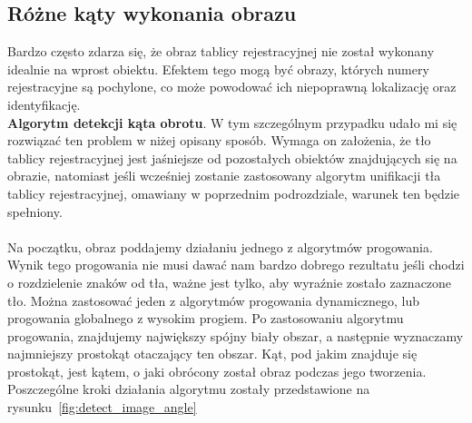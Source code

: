 \subsection{Różne kąty wykonania obrazu}
Bardzo często zdarza się, że obraz tablicy rejestracyjnej nie został wykonany idealnie na wprost obiektu. Efektem tego mogą być obrazy, których numery rejestracyjne są pochylone, co może powodować ich niepoprawną lokalizację oraz identyfikację. \\
\textbf{Algorytm detekcji kąta obrotu}. W tym szczególnym przypadku udało mi się rozwiązać ten problem w niżej opisany sposób. Wymaga on założenia, że tło tablicy rejestracyjnej jest jaśniejsze od pozostałych obiektów znajdujących się na obrazie, natomiast jeśli wcześniej zostanie zastosowany algorytm unifikacji tła tablicy rejestracyjnej, omawiany w poprzednim podrozdziale, warunek ten będzie spełniony.
\paragraph{}
Na początku, obraz poddajemy działaniu jednego z algorytmów progowania. Wynik tego progowania nie musi dawać nam bardzo dobrego rezultatu jeśli chodzi o rozdzielenie znaków od tła, ważne jest tylko, aby wyraźnie zostało zaznaczone tło. Można zastosować jeden z algorytmów progowania dynamicznego, lub progowania globalnego z wysokim progiem. Po zastosowaniu algorytmu progowania, znajdujemy największy spójny biały obszar, a następnie wyznaczamy najmniejszy prostokąt otaczający ten obszar. Kąt, pod jakim znajduje się prostokąt, jest kątem, o jaki obrócony został obraz podczas jego tworzenia.\\
Poszczególne kroki działania algorytmu zostały przedstawione na rysunku~\ref{fig:detect_image_angle}

